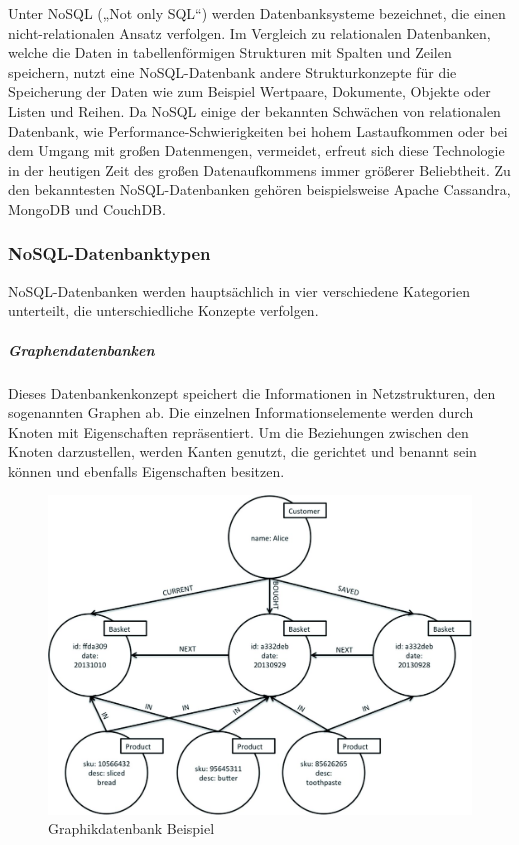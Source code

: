 Unter NoSQL („Not only SQL“) werden Datenbanksysteme bezeichnet, die einen nicht-relationalen Ansatz verfolgen. Im Vergleich zu relationalen Datenbanken, welche die Daten in tabellenförmigen Strukturen mit Spalten und Zeilen speichern, nutzt eine NoSQL-Datenbank andere Strukturkonzepte für die Speicherung der Daten wie zum Beispiel Wertpaare, Dokumente, Objekte oder Listen und Reihen. Da NoSQL einige der bekannten Schwächen von relationalen Datenbank, wie Performance-Schwierigkeiten bei hohem Lastaufkommen oder bei dem Umgang mit großen Datenmengen, vermeidet, erfreut sich diese Technologie in der heutigen Zeit des großen Datenaufkommens immer größerer Beliebtheit. \cite{DB1}
Zu den bekanntesten NoSQL-Datenbanken gehören beispielsweise Apache Cassandra, MongoDB und CouchDB.
\newline

\subsubsection{NoSQL-Datenbanktypen}
NoSQL-Datenbanken werden hauptsächlich in vier verschiedene Kategorien unterteilt, die unterschiedliche Konzepte verfolgen.
\newline

\noindent
\subparagraph{Graphendatenbanken}
Dieses Datenbankenkonzept speichert die Informationen in Netzstrukturen, den sogenannten Graphen ab. Die einzelnen Informationselemente werden durch Knoten mit Eigenschaften repräsentiert. Um die Beziehungen zwischen den Knoten darzustellen, werden Kanten genutzt, die gerichtet und benannt sein können und ebenfalls Eigenschaften besitzen.

\begin{figure}[h]
\centering
\includegraphics[]{images/graphikdatabase.jpg}
\caption{Graphikdatenbank Beispiel \protect \footnotemark}
\end{figure}

